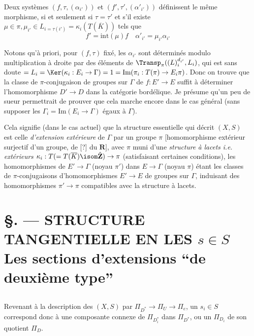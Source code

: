Deux systèmes $(f, \tau, (\alpha_{i'}))$ et $(f', \tau', (\alpha'_{i'}))$ définissent le même morphisme, si et seulement si $\tau = \tau'$ et s'il existe $\boxed{\mu \in \pi, \mu_{i'} \in L_{i = \tau (i')} = \kappa_i(T(\overline{K}))}$ tels que
$$
f' = \text{int}(\mu)f \quad \alpha'_{i'} = \mu_{i'} \alpha_{i'}
$$

Notons qu'à priori, pour $(f, \tau)$ fixé, les $\alpha_{i'}$ sont déterminés modulo multiplication à droite par des éléments de $\Transp_\pi ((L)^{d_{i'}}_i, L_i)$, qui est sans doute $= L_i = \Ker(\kappa_i: E_i \to \Gamma) = 1 = \text{Im}(\pi_i: T(\pi) \to E_i \pi)$. Donc on trouve que la classe de $\pi$-conjugaison de groupes sur $\Gamma$ de $f: E' \to E$ suffit à déterminer l'homomorphisme $D' \to D$ dans la catégorie bordélique. Je présume qu'un peu de sueur permettrait de prouver que cela marche encore dans le cas général (sans supposer les 
$\Gamma_i = \text{Im}(E_i \to \Gamma)$ égaux à $\Gamma$).

Cela signifie (dans le cas actuel) que la structure essentielle qui décrit $(X, S)$ est celle \emph{d'extension extérieure} de $\Gamma$ par un groupe $\pi$ [homomorphisme extérieur surjectif d'un groupe, de [?] du $\mathbf{R}$], avec $\pi$ muni d'une \emph{structure à lacets i.e. extérieurs $\kappa_i: T(= T(\overline{K}) \isom \hat{\mathbf{Z}}) \to \pi$} (satisfaisant certaines conditions), les homomorphismes de $E' \to \Gamma$ (noyau $\pi'$) dans $E \to \Gamma$ (noyau $\pi$) étant les classes de $\pi$-conjugaisons d'homomorphismes $E' \to E$ de groupes sur $\Gamma$, induisant des homomorphismes $\pi' \to \pi$ compatibles avec la structure à lacets.









\chapter*{\S {}. --- STRUCTURE TANGENTIELLE EN LES $s\in S$ \\ Les sections d'extensions ``de deuxième type''}\thispagestyle{empty}
\label{sec:9}
\section*{}

Revenant à la description des $(X, S)$ par $\Pi_{D^*} \to \Pi_U \to \Pi_e$, un $s_i \in S$ correspond donc à une composante connexe de $\Pi_{D^*_i}$ dans $\Pi_{D^*}$, ou un $\Pi_{D_i}$ de son quotient $\Pi_D$.

